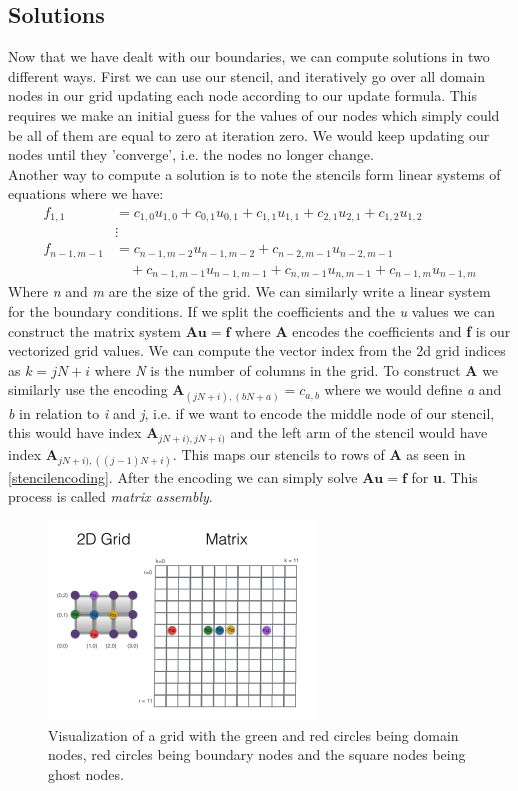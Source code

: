 \subsection{Solutions}
Now that we have dealt with our boundaries, we can compute solutions in two different ways. First we can use our stencil, and iteratively go over all domain nodes in our grid updating each node according to our update formula. This requires we make an initial guess for the values of our nodes which simply could be all of them are equal to zero at iteration zero. We would keep updating our nodes until they 'converge', i.e. the nodes no longer change.\\
Another way to compute a solution is to note the stencils form linear systems of equations where we have:
\begin{align*}
	f_{1,1} &= c_{1,0}u_{1,0} + c_{0,1}u_{0,1} + c_{1,1}u_{1,1} + c_{2,1}u_{2,1} + c_{1,2}u_{1,2}\\
	&\vdots \\
	f_{n-1,m-1} & = c_{n-1,m-2}u_{n-1,m-2} + c_{n-2,m-1}u_{n-2,m-1}\\
	&\quad + c_{n-1,m-1}u_{n-1,m-1} + c_{n,m-1}u_{n,m-1} + c_{n-1,m}u_{n-1,m}
\end{align*}
Where \textit{n} and \textit{m} are the size of the grid. We can similarly write a linear system for the boundary conditions. If we split the coefficients and the \textit{u} values we can construct the matrix system $\mathbf{Au} = \mathbf{f}$ where \textbf{A} encodes the coefficients and \textbf{f} is our vectorized grid values. We can compute the vector index from the 2d grid indices as $k = jN+i$ where \textit{N} is the number of columns in the grid. To construct \textbf{A} we similarly use the encoding $\mathbf{A}_{(jN+i),(bN+a)} = c_{a,b}$ where we would define \textit{a} and \textit{b} in relation to \textit{i} and \textit{j}, i.e. if we want to encode the middle node of our stencil, this would have index $\mathbf{A}_{jN+i),jN+i)}$ and the left arm of the stencil would have index $\mathbf{A}_{jN+i),((j-1)N+i)}$. This maps our stencils to rows of \textbf{A} as seen in \autoref{stencilencoding}. After the encoding we can simply solve $\mathbf{Au} = \mathbf{f}$ for \textbf{u}. This process is called \textit{matrix assembly}.
\begin{figure}[H]
	\centering
	\includegraphics[width=0.5\linewidth]{Materials/stencilencoding}
	\caption{Visualization of a grid with the green and red circles being domain nodes, red circles being boundary nodes and the square nodes being ghost nodes.}
	\label{stencilencoding}
\end{figure}